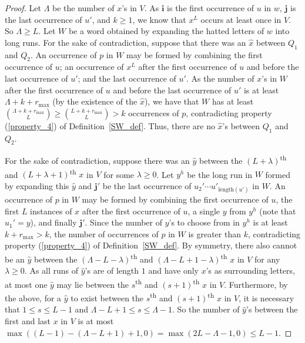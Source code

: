 \documentclass[11pt]{amsart}
\newcommand{\hatted}[1]{\widehat{#1}}
\begin{document}
\begin{proof}
    Let $\Lambda$ be the number of $x$'s in $V$. As $\mathbf{i}$ is the first occurrence of $u$ in $w$, $\mathbf{j}$ is the last occurrence of $u'$, and $k\geq1$, we know that $x^L$ occurs at least once in $V$. So $\Lambda\geq L$. Let $W$ be a word obtained by expanding the hatted letters of $w$ into long runs. For the sake of contradiction, suppose that there was an $\hatted{x}$ between $Q_1$ and $Q_2$. An occurrence of $p$ in $W$ may be formed by combining the first occurrence of $u$; an occurrence of $x^L$ after the first occurrence of $u$ and before the last occurrence of $u'$; and the last occurrence of $u'$. As the number of $x$'s in $W$ after the first occurrence of $u$ and before the last occurrence of $u'$ is at least $\Lambda+k+r_{\max}$ (by the existence of the $\hatted{x}$), we have that $W$ has at least ${\Lambda+k+r_{\max}\choose L}\geq{L+k+r_{\max}\choose L}>k$ occurrences of $p$, contradicting property (\ref{property_4}) of Definition~\ref{SW_def}. Thus, there are no $\hatted{x}$'s between $Q_1$ and $Q_2$.

    For the sake of contradiction, suppose there was an $\hatted{y}$ between the $(L+\lambda)$\textsuperscript{th} and $(L+\lambda+1)$\textsuperscript{th} $x$ in $V$ for some $\lambda\geq0$. Let $y^h$ be the long run in $W$ formed by expanding this $\hatted{y}$ and $\mathbf{j}'$ be the last occurrence of $u_2'\cdots u'_{\text{length}(u')}$ in $W$. An occurrence of $p$ in $W$ may be formed by combining the first occurrence of $u$, the first $L$ instances of $x$ after the first occurrence of $u$, a single $y$ from $y^h$ (note that $u_1'=y$), and finally $\mathbf{j}'$. Since the number of $y$'s to choose from in $y^h$ is at least $k+r_{\max}>k$, the number of occurrences of $p$ in $W$ is greater than $k$, contradicting property (\ref{property_4}) of Definition~\ref{SW_def}. By symmetry, there also cannot be an $\hatted{y}$ between the $(\Lambda-L-\lambda)$\textsuperscript{th} and $(\Lambda-L+1-\lambda)$\textsuperscript{th} $x$ in $V$ for any $\lambda\geq0$. As all runs of $\hatted{y}$'s are of length $1$ and have only $x$'s as surrounding letters, at most one $\hatted{y}$ may lie between the $s$\textsuperscript{th} and $(s+1)$\textsuperscript{th} $x$ in $V$. Furthermore, by the above, for a $\hatted{y}$ to exist between the $s$\textsuperscript{th} and $(s+1)$\textsuperscript{th} $x$ in $V$, it is necessary that $1\leq s\leq L-1$ and $\Lambda-L+1\leq s\leq \Lambda-1$. So the number of $\hatted{y}$'s between the first and last $x$ in $V$ is at most $\max((L-1)-(\Lambda-L+1)+1,0)=\max(2L-\Lambda-1,0)\leq L-1$.
\end{proof}
\end{document}
